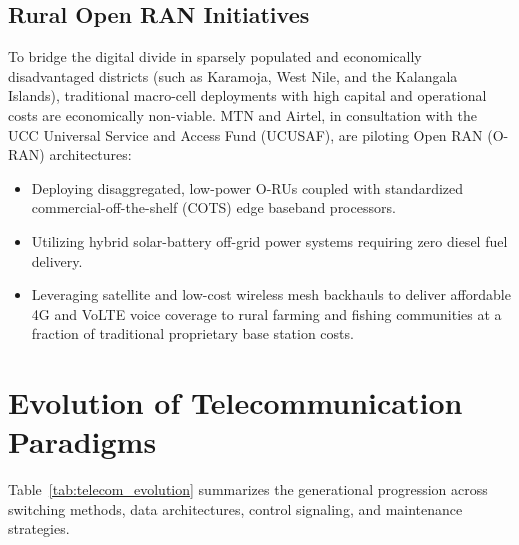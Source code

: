 \documentclass[12pt,a4paper]{report}
\begin{document}
\subsection{Rural Open RAN Initiatives}
To bridge the digital divide in sparsely populated and economically disadvantaged districts (such as Karamoja, West Nile, and the Kalangala Islands), traditional macro-cell deployments with high capital and operational costs are economically non-viable. MTN and Airtel, in consultation with the UCC Universal Service and Access Fund (UCUSAF), are piloting Open RAN (O-RAN) architectures:
\begin{itemize}
    \item Deploying disaggregated, low-power O-RUs coupled with standardized commercial-off-the-shelf (COTS) edge baseband processors.
    \item Utilizing hybrid solar-battery off-grid power systems requiring zero diesel fuel delivery.
    \item Leveraging satellite and low-cost wireless mesh backhauls to deliver affordable 4G and VoLTE voice coverage to rural farming and fishing communities at a fraction of traditional proprietary base station costs.
\end{itemize}

\section{Evolution of Telecommunication Paradigms}
Table~\ref{tab:telecom_evolution} summarizes the generational progression across switching methods, data architectures, control signaling, and maintenance strategies.
\end{document}
